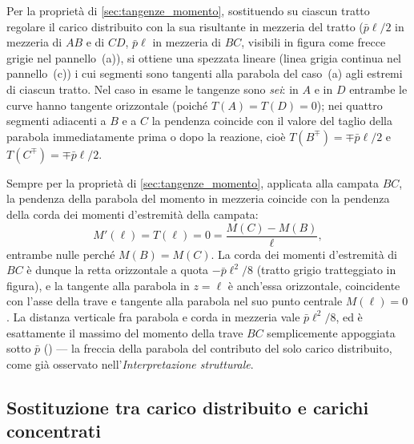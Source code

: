 \begin{esempio}
\begin{svolgimento}
		Per la proprietà di \ref{sec:tangenze_momento},
		sostituendo su ciascun tratto regolare il carico
		distribuito con la sua risultante in mezzeria del
		tratto ($\bar p\ell/2$ in mezzeria di $AB$ e di
		$CD$, $\bar p\ell$ in mezzeria di $BC$, visibili
		in figura come frecce grigie nel pannello~(a)),
		si ottiene una spezzata lineare (linea grigia
		continua nel pannello~(c)) i cui segmenti sono
		tangenti alla parabola del caso~(a) agli estremi
		di ciascun tratto. Nel caso in esame le tangenze
		sono \emph{sei}: in $A$ e in $D$ entrambe le curve
		hanno tangente orizzontale (poiché
		$T(A) = T(D) = 0$); nei quattro segmenti adiacenti
		a $B$ e a $C$ la pendenza coincide con il valore
		del taglio della parabola immediatamente prima o
		dopo la reazione, cioè
		$T(B^\mp) = \mp\bar p\ell/2$ e
		$T(C^\mp) = \mp\bar p\ell/2$.
		
		Sempre per la proprietà di \ref{sec:tangenze_momento},
		applicata alla campata $BC$, la pendenza della
		parabola del momento in mezzeria coincide con la
		pendenza della corda dei momenti d'estremità della
		campata:
		\[
		M'(\ell) = T(\ell) = 0 = \frac{M(C) - M(B)}{\ell},
		\]
		entrambe nulle perché $M(B) = M(C)$. La corda dei
		momenti d'estremità di $BC$ è dunque la retta
		orizzontale a quota $-\bar p\ell^2/8$ (tratto grigio
		tratteggiato in figura), e la tangente alla parabola
		in $z = \ell$ è anch'essa orizzontale, coincidente
		con l'asse della trave e tangente alla parabola nel
		suo punto centrale $M(\ell) = 0$. La distanza
		verticale fra parabola e corda in mezzeria vale
		$\bar p\ell^2/8$, ed è esattamente il massimo del
		momento della trave $BC$ semplicemente appoggiata
		sotto $\bar p$ () ---
		la freccia della parabola del contributo del solo
		carico distribuito, come già osservato
		nell'\emph{Interpretazione strutturale}.
		
	\end{svolgimento}
\end{esempio}




\subsection{Sostituzione tra carico distribuito e carichi concentrati}
\label{sec:sostituzione_distribuito_concentrato}

